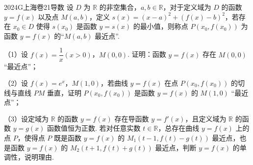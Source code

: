 
\begin{problem}{2024}{G}{上海卷}{21}{导数}
设 $D$ 为 $\mathbb{R}$ 的非空集合，$a,b \in \mathbb{R}$，对于定义域为 $D$ 的函数 $y=f(x)$ 以及点 $M(a,b)$，定义 $s(x)=(x-a)^2+(f(x)-b)^2$，若存在 $x_0 \in D$ 使得 $s(x_0)$ 是函数 $y=s(x)$ 的最小值，则称点 $P(x_0, f(x_0))$ 为函数 $y=f(x)$ 的“$M(a,b)$ 最近点”.

（1）设 $f(x)=\dfrac{1}{x} (x>0)$，$M(0,0)$. 证明：函数 $y=f(x)$ 存在 $M(0,0)$ “最近点”；

（2）设 $f(x)=e^x$，$M(1,0)$，若曲线 $y=f(x)$ 在点 $P(x_0, f(x_0))$ 的切线与直线 $PM$ 垂直，证明 $P(x_0, f(x_0))$ 是函数 $y=f(x)$ 的 $M(1,0)$ “最近点”；

（3）设定域为 $\mathbb{R}$ 的函数 $y=f(x)$ 存在导函数 $y=f'(x)$，且定义域为 $\mathbb{R}$ 的函数 $y=g(x)$ 函数值恒为正数. 若对任意实数 $t \in \mathbb{R}$，总存在曲线 $y=f(x)$ 上的点 $P$，使得点 $P$ 既是函数 $y=f(x)$ 的 $M_1(t-1, f(t)-g(t))$ 最近点，也是函数 $y=f(x)$ 的 $M_2(t+1, f(t)+g(t))$ 最近点，判断 $y=f(x)$ 的单调性，说明理由.
\end{problem}

\begin{answer}
\end{answer}

\begin{solutions}
\end{solutions}